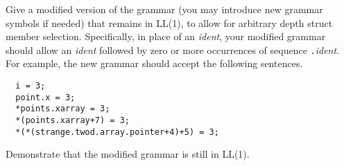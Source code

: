 \documentclass[10pt]{article}
\begin{document}
Give a modified version of the grammar
(you may introduce new grammar symbols if needed)
that remains in LL(1),
to allow for arbitrary depth struct member selection.
Specifically,
in place of an \emph{ident},
your modified grammar should allow
an \emph{ident} followed by zero or more
occurrences of sequence \verb|.|\emph{ident}.
For example, the new grammar should accept
the following sentences.
\begin{verbatim}
  i = 3;
  point.x = 3;
  *points.xarray = 3;
  *(points.xarray+7) = 3;
  *(*(strange.twod.array.pointer+4)+5) = 3;
\end{verbatim}
Demonstrate that the modified grammar is still in LL(1).
\end{document}
